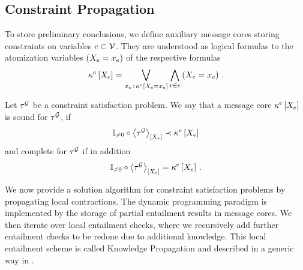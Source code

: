 \subsection{Constraint Propagation}



To store preliminary conclusions, we define auxiliary message cores storing constraints on variables $e\subset\mathcal{V}$.
They are understood as logical formulas to the atomization variables $\left(X_{e}=x_{e}\right)$ of the respective formulas
\begin{align*}
    \kappa^{e}\left[X_{e}\right]
    = \bigvee_{x_{e} \,:\, \kappa^{e}\left[X_{e}=x_{e}\right]} \bigwedge_{v\in e} \left(X_{e}=x_{e}\right) \, .
\end{align*}

\begin{definition}\label{def:knowledgeCoreSoundComplete}
    Let $\tau^{\mathcal{G}}$ be a constraint satisfaction problem. %
    We say that a message core $\kappa^{e}\left[X_{e}\right]$ is sound for $\tau^{\mathcal{G}}$, if
    \begin{align*}
        \mathbb{I}_{\neq0}\circ\left\langle \tau^{\mathcal{G}}\right\rangle_{\left[ X_{e} \right]}  \prec \kappa^{e}\left[X_{e}\right]
    \end{align*}
    and complete for $\tau^{\mathcal{G}}$ if in addition
    \begin{align*}
        \mathbb{I}_{\neq0}\circ\left\langle \tau^{\mathcal{G}}\right\rangle_{\left[ X_{e} \right]}=\kappa^{e}\left[X_{e}\right] \, .
    \end{align*}
\end{definition}

We now provide a solution algorithm for constraint satisfaction problems by propagating local contractions.
The dynamic programming paradigm is implemented by the storage of partial entailment results in message cores.
We then iterate over local entailment checks, where we recursively add further entailment checks to be redone due to additional knowledge.
This local entailment scheme is called Knowledge Propagation and described in a generic way in .

